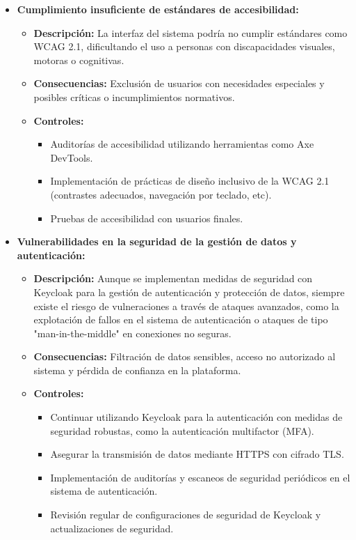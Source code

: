 \documentclass[stu, 12pt, letterpaper, donotrepeattitle, floatsintext, natbib]{apa7}
\begin{document}
\begin{itemize}
    \item \textbf{Cumplimiento insuficiente de estándares de accesibilidad:} 
    \begin{itemize}
        \item \textbf{Descripción:} La interfaz del sistema podría no cumplir estándares como WCAG 2.1, dificultando el uso a personas con discapacidades visuales, motoras o cognitivas.
        \item \textbf{Consecuencias:} Exclusión de usuarios con necesidades especiales y posibles críticas o incumplimientos normativos.
        \item \textbf{Controles:} 
        \begin{itemize}
            \item Auditorías de accesibilidad utilizando herramientas como Axe DevTools.
            \item Implementación de prácticas de diseño inclusivo de la WCAG 2.1 (contrastes adecuados, navegación por teclado, etc).
            \item Pruebas de accesibilidad con usuarios finales.
        \end{itemize}
    \end{itemize}

    \item \textbf{Vulnerabilidades en la seguridad de la gestión de datos y autenticación:} 
    \begin{itemize}
        \item \textbf{Descripción:} Aunque se implementan medidas de seguridad con Keycloak para la gestión de autenticación y protección de datos, siempre existe el riesgo de vulneraciones a través de ataques avanzados, como la explotación de fallos en el sistema de autenticación o ataques de tipo "man-in-the-middle" en conexiones no seguras.
        \item \textbf{Consecuencias:} Filtración de datos sensibles, acceso no autorizado al sistema y pérdida de confianza en la plataforma.
        \item \textbf{Controles:} 
        \begin{itemize}
            \item Continuar utilizando Keycloak para la autenticación con medidas de seguridad robustas, como la autenticación multifactor (MFA).
            \item Asegurar la transmisión de datos mediante HTTPS con cifrado TLS.
            \item Implementación de auditorías y escaneos de seguridad periódicos en el sistema de autenticación.
            \item Revisión regular de configuraciones de seguridad de Keycloak y actualizaciones de seguridad.
        \end{itemize}
    \end{itemize}


\end{itemize}
\end{document}
